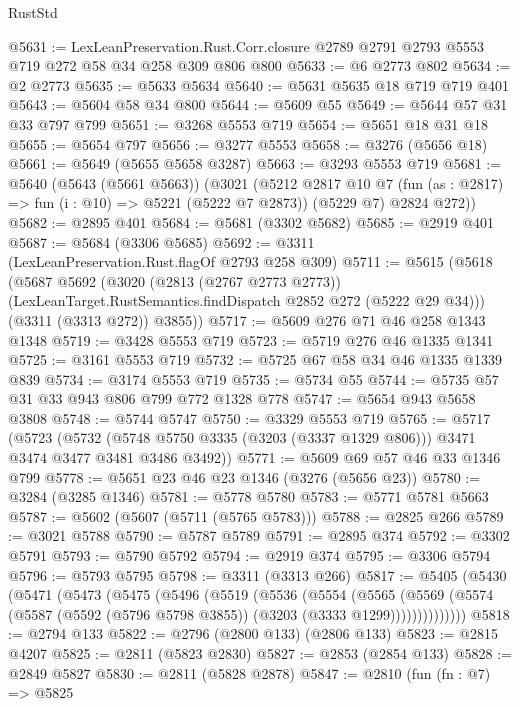 \begin{lexlean}{RustStd}
\begin{coremodule}
@5631 := LexLeanPreservation.Rust.Corr.closure
    @2789
    @2791
    @2793
    @5553
    @719
    @272
    @58
    @34
    @258
    @309
    @806
    @800
@5633 := @6 @2773 @802
@5634 := @2 @2773
@5635 := @5633 @5634
@5640 := @5631 @5635 @18 @719 @719 @401
@5643 := @5604 @58 @34 @800
@5644 := @5609 @55
@5649 := @5644 @57 @31 @33 @797 @799
@5651 := @3268 @5553 @719
@5654 := @5651 @18 @31 @18
@5655 := @5654 @797
@5656 := @3277 @5553
@5658 := @3276 (@5656 @18)
@5661 := @5649 (@5655 @5658 @3287)
@5663 := @3293 @5553 @719
@5681 := @5640
    (@5643 (@5661 @5663))
    (@3021
      (@5212
        @2817
        @10
        @7
        (fun (as : @2817) => fun (i : @10) => @5221 (@5222 @7 @2873))
        (@5229 @7)
        @2824
        @272))
@5682 := @2895 @401
@5684 := @5681 (@3302 @5682)
@5685 := @2919 @401
@5687 := @5684 (@3306 @5685)
@5692 := @3311 (LexLeanPreservation.Rust.flagOf @2793 @258 @309)
@5711 := @5615
    (@5618
      (@5687
        @5692
        (@3020
          (@2813 (@2767 @2773 @2773))
          (LexLeanTarget.RustSemantics.findDispatch @2852 @272 (@5222 @29 @34)))
        (@3311 (@3313 @272))
        @3855))
@5717 := @5609 @276 @71 @46 @258 @1343 @1348
@5719 := @3428 @5553 @719
@5723 := @5719 @276 @46 @1335 @1341
@5725 := @3161 @5553 @719
@5732 := @5725 @67 @58 @34 @46 @1335 @1339 @839
@5734 := @3174 @5553 @719
@5735 := @5734 @55
@5744 := @5735 @57 @31 @33 @943 @806 @799 @772 @1328 @778
@5747 := @5654 @943 @5658 @3808
@5748 := @5744 @5747
@5750 := @3329 @5553 @719
@5765 := @5717
    (@5723
      (@5732 (@5748 @5750 @3335 (@3203 (@3337 @1329 @806))) @3471 @3474 @3477 @3481 @3486 @3492))
@5771 := @5609 @69 @57 @46 @33 @1346 @799
@5778 := @5651 @23 @46 @23 @1346 (@3276 (@5656 @23))
@5780 := @3284 (@3285 @1346)
@5781 := @5778 @5780
@5783 := @5771 @5781 @5663
@5787 := @5602 (@5607 (@5711 (@5765 @5783)))
@5788 := @2825 @266
@5789 := @3021 @5788
@5790 := @5787 @5789
@5791 := @2895 @374
@5792 := @3302 @5791
@5793 := @5790 @5792
@5794 := @2919 @374
@5795 := @3306 @5794
@5796 := @5793 @5795
@5798 := @3311 (@3313 @266)
@5817 := @5405
    (@5430
      (@5471
        (@5473
          (@5475
            (@5496
              (@5519
                (@5536
                  (@5554
                    (@5565
                      (@5569
                        (@5574 (@5587 (@5592 (@5796 @5798 @3855)) (@3203 (@3333 @1299))))))))))))))
@5818 := @2794 @133
@5822 := @2796 (@2800 @133) (@2806 @133)
@5823 := @2815 @4207
@5825 := @2811 (@5823 @2830)
@5827 := @2853 (@2854 @133)
@5828 := @2849 @5827
@5830 := @2811 (@5828 @2878)
@5847 := @2810
    (fun (fn : @7) =>
    @5825

\end{coremodule}
\end{lexlean}
